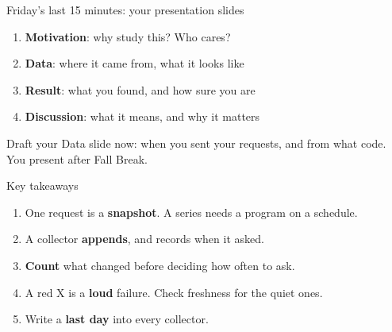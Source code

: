 \documentclass[9pt,aspectratio=169]{beamer}
\begin{document}
\begin{frame}{Friday's last 15 minutes: your presentation slides}

    \medskip
    \begin{enumerate}\small
        \item \textbf{Motivation}: why study this? Who cares?
        \item \textbf{Data}: where it came from, what it looks like
        \item \textbf{Result}: what you found, and how sure you are
        \item \textbf{Discussion}: what it means, and why it matters
    \end{enumerate}

    \medskip
    Draft your Data slide now: when you sent your requests, and from what code. You present after Fall Break.
\end{frame}

\begin{frame}{Key takeaways}
    \begin{enumerate}
        \item One request is a \textbf{snapshot}. A series needs a program on a schedule.
        \item A collector \textbf{appends}, and records when it asked.
        \item \textbf{Count} what changed before deciding how often to ask.
        \item A red X is a \textbf{loud} failure. Check freshness for the quiet ones.
        \item Write a \textbf{last day} into every collector.
    \end{enumerate}
\end{frame}
\end{document}
